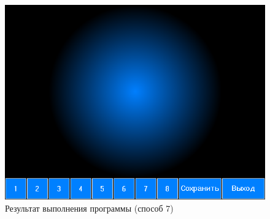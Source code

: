 \documentclass[14pt, a4paper]{extreport}
\begin{document}
\begin{figure}[h!]
	\centering
	\includegraphics[width = 12cm]{image/image_7}
  \caption{Результат выполнения программы (способ 7)}
\end{figure}

\end{document}
